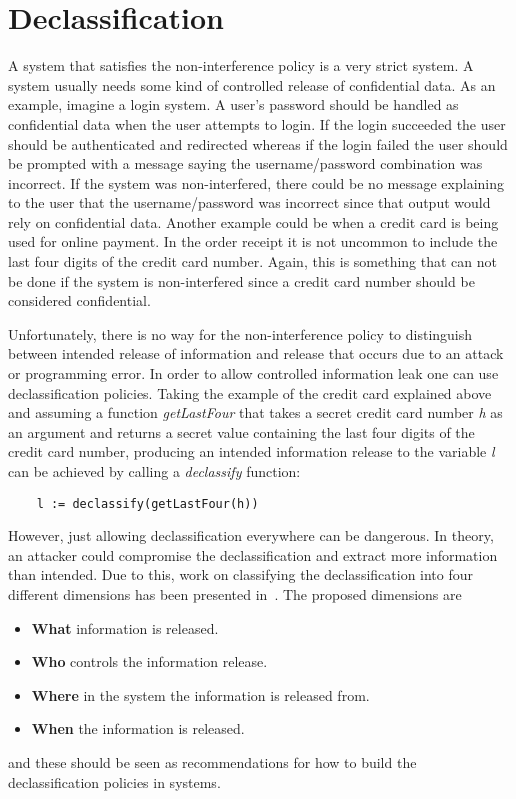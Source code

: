 \section{Declassification}
\label{chapter:declassification}
A system that satisfies the non-interference policy is a very strict system. A system usually needs some kind of controlled release of confidential data. As an example, imagine a login system. A user's password should be handled as confidential data when the user attempts to login. If the login succeeded the user should be authenticated and redirected whereas if the login failed the user should be prompted with a message saying the username/password combination was incorrect. If the system was non-interfered, there could be no message explaining to the user that the username/password was incorrect since that output would rely on confidential data. Another example could be when a credit card is being used for online payment. In the order receipt it is not uncommon to include the last four digits of the credit card number. Again, this is something that can not be done if the system is non-interfered since a credit card number should be considered confidential.

Unfortunately, there is no way for the non-interference policy to distinguish between intended release of information and release that occurs due to an attack or programming error. In order to allow controlled information leak one can use declassification policies.
Taking the example of the credit card explained above and assuming a function \emph{getLastFour} that takes a secret credit card number \emph{h} as an argument and returns a secret value containing the last four digits of the credit card number, producing an intended information release to the variable \emph{l} can be achieved by calling a \emph{declassify} function:
\begin{verbatim}
    l := declassify(getLastFour(h))
\end{verbatim}
However, just allowing declassification everywhere can be dangerous. In theory, an attacker could compromise the declassification and extract more information than intended. Due to this, work on classifying the declassification into four different dimensions has been presented in~\cite{declassification-dimensions}. The proposed dimensions are
\begin{itemize}
  \item \textbf{What} information is released.
  \item \textbf{Who} controls the information release.
  \item \textbf{Where} in the system the information is released from.
  \item \textbf{When} the information is released.
\end{itemize}
and these should be seen as recommendations for how to build the declassification policies in systems.
